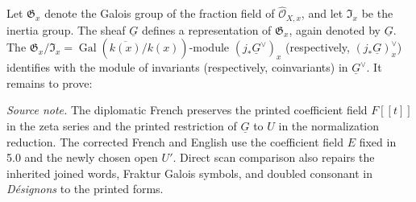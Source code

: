Let $\mathfrak G_x$ denote the Galois group of the fraction field of
$\widehat{\mathcal O}_{X,x}$, and let $\mathfrak I_x$ be the inertia group.
The sheaf $\underline G$ defines a representation of $\mathfrak G_x$, again
denoted by $\underline G$.  The $\mathfrak G_x/\mathfrak I_x=
\operatorname{Gal}(\overline{k(x)}/k(x))$-module
$(j_*\underline G^\vee)_x$ (respectively,
$(j_*\underline G)_x^\vee$) identifies with the module of invariants
(respectively, coinvariants) in $\underline G^\vee$.  It remains to prove:

\medskip
\noindent\emph{Source note.}
The diplomatic French preserves the printed coefficient field $F[[t]]$ in
the zeta series and the printed restriction of $\underline G$ to $U$ in the
normalization reduction.  The corrected French and English use the
coefficient field $E$ fixed in 5.0 and the newly chosen open $U'$.  Direct
scan comparison also repairs the inherited joined words, Fraktur Galois
symbols, and doubled consonant in \emph{D\'esignons} to the printed forms.

